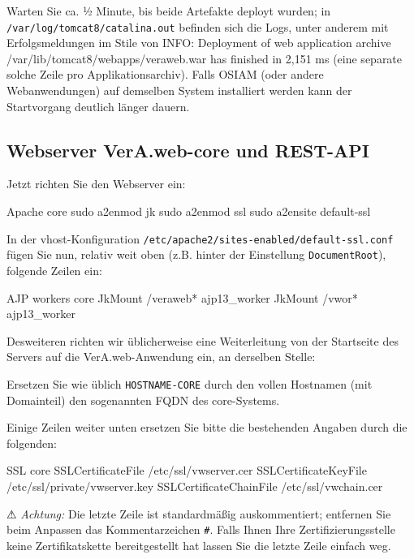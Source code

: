 Warten Sie ca. ½ Minute, bis beide Artefakte deployt wurden; in
\texttt{/var/log/tomcat8/catalina.out} befinden sich die Logs,
unter anderem mit Erfolgsmeldungen im Stile von {\ttfamily
INFO: Deployment of web application archive
/var/lib/tomcat8/webapps/veraweb.war has finished in 2,151 ms}
(eine separate solche Zeile pro Applikationsarchiv).
\ifoa
Falls OSIAM (oder andere Webanwendungen) auf demselben System
installiert werden kann der Startvorgang deutlich länger dauern.
\fi%

\subsection{Webserver VerA.web-core und REST-API}\label{subsec:setup-core-apache}

\begin{minipage}{\linewidth}
Jetzt richten Sie den Webserver ein:

\begin{lstdump}{Apache core}
sudo a2enmod jk
sudo a2enmod ssl
sudo a2ensite default-ssl
\end{lstdump}
\end{minipage}

\begin{minipage}{\linewidth}
In der vhost-Konfiguration \texttt{/etc/apache2/sites-enabled/default-ssl.conf}
fügen Sie nun, relativ weit oben (z.B. hinter der Einstellung
\texttt{DocumentRoot}), folgende Zeilen ein:

\begin{lstdump}{AJP workers core}
JkMount /veraweb* ajp13_worker
JkMount /vwor* ajp13_worker
\end{lstdump}
\end{minipage}

\begin{minipage}{\linewidth}
Desweiteren richten wir üblicherweise eine Weiterleitung von der
Startseite des Servers auf die VerA.web-Anwendung ein, an derselben Stelle:

\end{minipage}

Ersetzen Sie wie üblich \texttt{HOSTNAME-CORE} durch den vollen
Hostnamen (mit Domainteil) \dash den sogenannten FQDN \dash des
core-Systems.

\begin{minipage}{\linewidth}
Einige Zeilen weiter unten ersetzen Sie bitte die bestehenden
Angaben durch die folgenden:

\begin{lstdump}{SSL core}
SSLCertificateFile /etc/ssl/vwserver.cer
SSLCertificateKeyFile /etc/ssl/private/vwserver.key
SSLCertificateChainFile /etc/ssl/vwchain.cer
\end{lstdump}

⚠ \emph{Achtung:} Die letzte Zeile ist standardmäßig auskommentiert;
entfernen Sie beim Anpassen das Kommentarzeichen \texttt{\#}. Falls
Ihnen Ihre Zertifizierungsstelle keine Zertifikatskette bereitgestellt
hat lassen Sie die letzte Zeile einfach weg.
\end{minipage}

